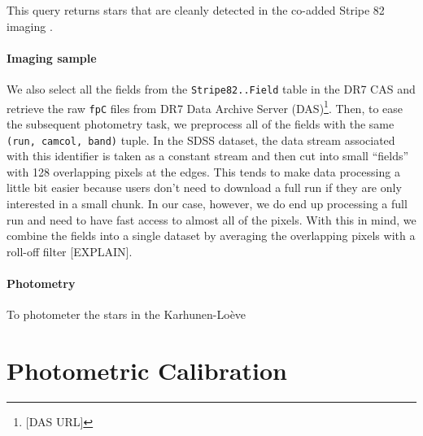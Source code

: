 \documentclass[12pt,preprint]{aastex}
\begin{document}
This query returns stars that are cleanly detected in the co-added Stripe 82
imaging \citep{dr7}.

\paragraph{Imaging sample}
We also select all the fields from the \texttt{Stripe82..Field} table in the
DR7 CAS and retrieve the raw \texttt{fpC} files from DR7 Data Archive Server
(DAS)\footnote{[DAS URL]}. Then, to ease the subsequent photometry task, we
preprocess all of the fields with the same \texttt{(run, camcol, band)}
tuple. In the SDSS dataset, the data stream associated with this identifier
is taken as a constant stream and then cut into small ``fields'' with 128
overlapping pixels at the edges. This tends to make data processing a little
bit easier because users don't need to download a full run if they are only
interested in a small chunk. In our case, however, we do end up processing a
full run and need to have fast access to almost all of the pixels. With this
in mind, we combine the fields into a single dataset by averaging the
overlapping pixels with a roll-off filter [EXPLAIN].

\paragraph{Photometry}
To photometer the stars in the Karhunen-Lo\`eve

\section{Photometric Calibration}
\end{document}
